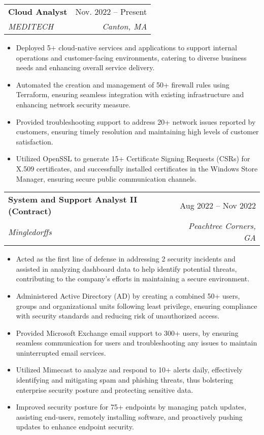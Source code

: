\documentclass[letterpaper,11pt]{article}
\makeatletter
\newcommand{\resumeItem}[1]{
  \item\small{
    {#1 \vspace{-2pt}}
  }
}
\newcommand{\resumeSubheading}[4]{
  \vspace{-2pt}\item
    \begin{tabular*}{0.97\textwidth}[t]{l@{\extracolsep{\fill}}r}
      \textbf{#1} & #2 \\
      \textit{\small#3} & \textit{\small #4} \\
    \end{tabular*}\vspace{-7pt}
}
\newcommand{\resumeItemListStart}{\begin{itemize}}
\newcommand{\resumeItemListEnd}{\end{itemize}\vspace{-5pt}}
\makeatother
\begin{document}
    \resumeSubheading
      {Cloud Analyst}{Nov. 2022 -- Present}
      {MEDITECH}{Canton, MA}
      \resumeItemListStart
        \resumeItem{Deployed 5+ cloud-native services and applications to support internal operations and customer-facing environments, catering to diverse business needs and enhancing overall service delivery.}
        \resumeItem{Automated the creation and management of 50+ firewall rules using Terraform, ensuring seamless integration with existing infrastructure and enhancing network security measure.}
        \resumeItem{Provided troubleshooting support to address 20+ network issues reported by customers, ensuring timely resolution and maintaining high levels of customer satisfaction.}
        \resumeItem{Utilized OpenSSL to generate 15+ Certificate Signing Requests (CSRs) for X.509 certificates, and successfully installed certificates in the Windows Store Manager, ensuring secure public communication channels.}
    \resumeItemListEnd

    \resumeSubheading
      {System and Support Analyst II (Contract)}{Aug 2022 -- Nov 2022}
      {Mingledorffs}{Peachtree Corners, GA}
      \resumeItemListStart
        \resumeItem{Acted as the first line of defense in addressing 2 security incidents and assisted in analyzing dashboard data to help identify potential threats, contributing to the company's efforts in maintaining a secure environment.}
        \resumeItem{Administered Active Directory (AD) by creating a combined 50+ users, groups and organizational units following least privilege, ensuring compliance with security standards and reducing risk of unauthorized access.}
        \resumeItem{Provided Microsoft Exchange email support to 300+ users, by ensuring seamless communication for users and troubleshooting any issues to maintain uninterrupted email services.}
        \resumeItem{Utilized Mimecast to analyze and respond to 10+ alerts daily, effectively identifying and mitigating spam and phishing threats, thus bolstering enterprise security posture and protecting sensitive data.}
        \resumeItem{Improved security posture for 75+ endpoints by managing patch updates, assisting end-users, remotely installing software, and proactively pushing updates to enhance endpoint security.} 
    \resumeItemListEnd
\end{document}
